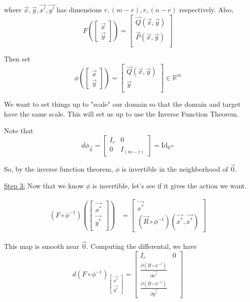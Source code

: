 \documentclass{article}
\newcommand{\R}{\mathbb{R}}
\begin{document}
where $\vec{x}, \vec{y}, \vec{x'}, \vec{y'}$ has dimensions $r, (m-r), r, (n-r)$ respectively. Also, 
\[ F \left( \begin{bmatrix}
  \vec{x} \\
  \vec{y}
\end{bmatrix}\right) = \begin{bmatrix}
  \vec{Q}(\vec{x}, \vec{y}) \\
  \vec{P}(\vec{x}, \vec{y}) \\
\end{bmatrix}\]

Then set 
\[ \phi \left( \begin{bmatrix}
  \vec{x} \\
  \vec{y}
\end{bmatrix}\right) = \begin{bmatrix}
  \vec{Q}(\vec{x}, \vec{y}) \\
  \vec{y} \\
\end{bmatrix} \in \R^m \]

\vskip 0.25cm
We want to set things up to "scale" our domain so that the domain and target have the same scale. This will set us up to use the Inverse Function Theorem.

\vskip 0.25cm
Note that 
\[ d\phi_{\vec{0}} = \begin{bmatrix}
  I_r & 0 \\
  0 & I_{(m-r)}

\end{bmatrix} = \mathrm{Id}_{\R^m} \]

So, by the inverse function theorem, $\phi$ is invertible in the neighborhood of $\vec{0}$.

\vskip 0.25cm
\underline{Step 3:} Now that we know $\phi$ is invertible, let's see if it gives the action we want.

\begin{align*}
  \left( F \circ \phi^{-1} \right) \left( \begin{bmatrix}
    \vec{x^*} \\
    \vec{y^*} \\
  \end{bmatrix} \right) &= \begin{bmatrix}
    \vec{x^*} \\
    \left( \vec{R} \circ \phi^{-1} \right) \left( \vec{x^*}, \vec{x^*} \right)
  \end{bmatrix} 
\end{align*}

This map is smooth near $\vec{0}$. Computing the differental, we have 
\[ d\left( F \circ \phi^{-1} \right)_{\begin{bmatrix}
  \vec{x^*} \\
  \vec{y^*}
\end{bmatrix}} = \begin{bmatrix}
  I_r & 0 \\
  \frac{\partial (R \circ \phi^{-1})}{\partial \vec{x^*}} \\ \frac{\partial (R \circ \phi^{-1})}{\partial \vec{y^*}}
\end{bmatrix} \]
\end{document}
